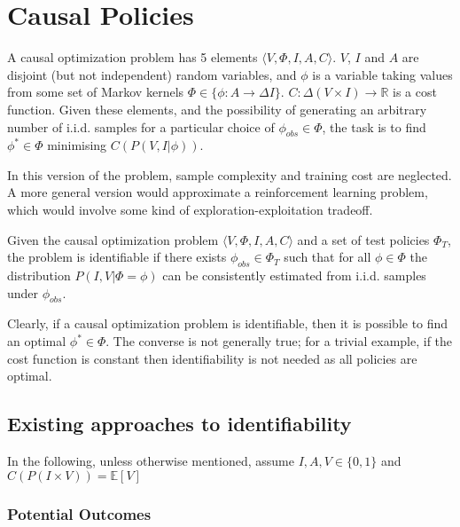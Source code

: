 \section{Causal Policies}

\begin{definition}\label{def:2s_copt_prob}
A causal optimization problem has 5 elements $\langle V, \Phi, I, A, C\rangle$. $V$, $I$ and $A$ are disjoint (but not independent) random variables, and $\phi$ is a variable taking values from some set of Markov kernels $\Phi\in\{\phi:A\to  \Delta I\}$. $C:\Delta(V\times I) \to \mathbb{R}$ is a cost function. Given these elements, and the possibility of generating an arbitrary number of i.i.d. samples for a particular choice of $\phi_{obs}\in\Phi$, the task is to find $\phi^*\in \Phi$ minimising $C(P(V, I|\phi))$.
\end{definition}

\begin{remark}
In this version of the problem, sample complexity and training cost are neglected. A more general version would approximate a reinforcement learning problem, which would involve some kind of exploration-exploitation tradeoff.
\end{remark}

\begin{definition}\label{def:causal_ident}
Given the causal optimization problem $\langle V, \Phi, I, A, C\rangle$ and a set of test policies $\Phi_T$, the problem is identifiable if there exists $\phi_{obs}\in\Phi_T$ such that for all $\phi\in\Phi$ the distribution $P(I,V|\Phi=\phi)$ can be consistently estimated from i.i.d. samples under $\phi_{obs}$.
\end{definition}

Clearly, if a causal optimization problem is identifiable, then it is possible to find an optimal $\phi^*\in \Phi$. The converse is not generally true; for a trivial example, if the cost function is constant then identifiability is not needed as all policies are optimal.

\subsection{Existing approaches to identifiability}

In the following, unless otherwise mentioned, assume $I,A,V\in \{0,1\}$ and $C(P(I\times V)) = \mathbb{E}[V]$

\subsubsection{Potential Outcomes}

